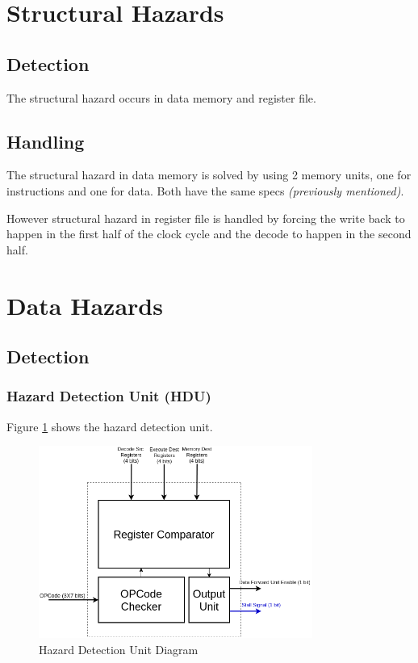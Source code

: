 \documentclass[12pt]{report}
\begin{document}
\section{Structural Hazards}

\subsection{Detection}
The structural hazard occurs in data memory and register file.

\subsection{Handling}
The structural hazard in data memory is solved by using 2 memory units, one for instructions and one for data. Both have the same specs \emph{(previously mentioned)}.

However structural hazard in register file is handled by forcing the write back to happen in the first half of the clock cycle and the decode to happen in the second half.

\section{Data Hazards}

\subsection{Detection}
\subsubsection{Hazard Detection Unit (HDU)}
Figure \ref{fig:hdu} shows the hazard detection unit.
\begin{figure}[hp]
    \centering
    \includegraphics[width=0.8\textwidth]{images/hdu}
    \caption{Hazard Detection Unit Diagram}
    \label{fig:hdu}
\end{figure}
\end{document}
